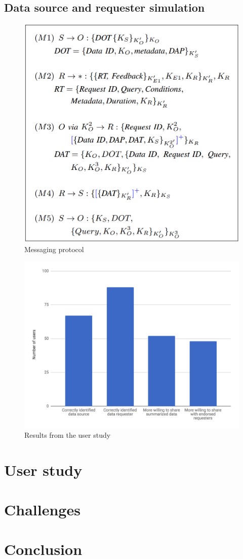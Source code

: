 \documentclass[conference]{IEEEtran}
\begin{document}
\subsection{Data source and requester simulation}
\begin{figure}[t]
	\includegraphics[width=0.95\linewidth]{message_protocol.png}
	\caption{Messaging protocol}
	\label{fig:mes_protocol}
\end{figure}


\begin{figure}[t]
	\includegraphics[width=0.95\linewidth]{user_study.png}
	\caption{Results from the user study}
	\label{fig:user_study}
\end{figure}
\section{User study}


\section{Challenges}


\section{Conclusion}


\begin{thebibliography}{00}

\end{thebibliography}
\end{document}
